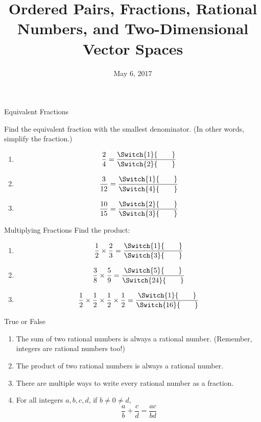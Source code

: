\documentclass[12pt,letterpaper]{article}
\title{Ordered Pairs, Fractions, Rational Numbers, and Two-Dimensional Vector
Spaces}
\date{May 6, 2017}
\begin{document}
\maketitle

\thispagestyle{empty}

\newcommand{\fracans}[2]{
\frac{\Switch{#1}{\hspace{2em}}}{\Switch{#2}{\hspace{2em}}}}

\begin{problem}{Equivalent Fractions}

 Find the equivalent fraction with the smallest denominator. (In other words,
 simplify the fraction.)

 \begin{enumerate}[\hspace{.5cm}a.]
  \item \[ \frac{2}{4} = \fracans{1}{2} \]
  \item \[ \frac{3}{12} = \fracans{1}{4} \]
  \item \[ \frac{10}{15} = \fracans{2}{3} \]
 \end{enumerate}
\end{problem}

\begin{problem}{Multiplying Fractions}
Find the product:

\begin{enumerate}[\hspace{.5cm}a.]
\item \[ \frac{1}{2} \times \frac{2}{3} = \fracans{1}{3} \]
\item \[ \frac{3}{8} \times \frac{5}{9} = \fracans{5}{24} \]
\item \[ \frac{1}{2} \times \frac{1}{2} \times \frac{1}{2} \times \frac{1}{2}
= \fracans{1}{16} \]
\end{enumerate}
\end{problem}

\begin{problem}{True or False}
  \begin{enumerate}
    \item The sum of two rational numbers is always a rational number.
    (Remember, integers are rational numbers too!) \hfill \TFTrue
    \item The product of two rational numbers is always a rational number.
    \hfill \TFTrue
    \item There are multiple ways to write every rational number as a fraction.
    \hfill \TFTrue
    \item For all integers \(a, b, c, d\), if \(b \ne 0 \ne d\), \[
      \frac{a}{b} + \frac{c}{d} = \frac{ac}{bd}
    \] \hfill \TFFalse
  \end{enumerate}
\end{problem}
\end{document}
